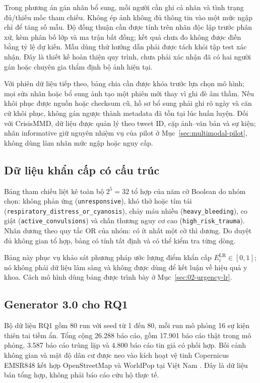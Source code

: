 Trong phương án gán nhãn bổ sung, mỗi người cần ghi cả nhãn và tình trạng đủ/thiếu mốc tham chiếu. Không ép ảnh không đủ thông tin vào một mức ngập chỉ để tăng số mẫu. Độ đồng thuận cần được tính trên nhãn độc lập trước phân xử, kèm phân bố lớp và ma trận bất đồng; kết quả chưa đo không được điền bằng tỷ lệ dự kiến. Mẫu dùng thử hướng dẫn phải được tách khỏi tập test xác nhận. Đây là thiết kế hoàn thiện quy trình, chưa phải xác nhận đã có hai người gán hoặc chuyên gia thẩm định bộ ảnh hiện tại.

Với phiên dữ liệu tiếp theo, bảng chia cần được khóa trước lựa chọn mô hình; mọi sửa nhãn hoặc bổ sung ảnh tạo một phiên mới thay vì ghi đè âm thầm. Nếu khôi phục được nguồn hoặc checksum cũ, hồ sơ bổ sung phải ghi rõ ngày và căn cứ khôi phục, không gán ngược thành metadata đã tồn tại lúc huấn luyện. Đối với CrisisMMD, dữ liệu được quản lý theo tweet ID, cặp ảnh--văn bản và sự kiện; nhãn informative giữ nguyên nhiệm vụ của pilot ở Mục~\ref{sec:multimodal-pilot}, không dùng làm nhãn mức ngập hoặc nguy cấp.

\subsection{Dữ liệu khẩn cấp có cấu trúc}
Bảng tham chiếu liệt kê toàn bộ $2^5=32$ tổ hợp của năm cờ Boolean do nhóm chọn: không phản ứng (\texttt{unresponsive}), khó thở hoặc tím tái (\texttt{respiratory\_\allowbreak{}distress\_\allowbreak{}or\_\allowbreak{}cyanosis}), chảy máu nhiều (\texttt{heavy\_bleeding}), co giật (\texttt{active\_convulsions}) và chấn thương nguy cơ cao (\texttt{high\_risk\_trauma}). Nhãn dương theo quy tắc OR của nhóm: có ít nhất một cờ thì dương. Do duyệt đủ không gian tổ hợp, bảng có tính tất định và có thể kiểm tra từng dòng.

Bảng này phục vụ khảo sát phương pháp ước lượng điểm khẩn cấp $E_i^{\mathrm{LR}}\in[0,1]$; nó không phải dữ liệu lâm sàng và không được dùng để kết luận về hiệu quả y khoa. Cách mô hình dùng bảng được trình bày ở Mục~\ref{sec:02-urgency-lr}.

\subsection{Generator 3.0 cho RQ1}
Bộ dữ liệu RQ1 gồm 80 run với seed từ 1 đến 80, mỗi run mô phỏng 16 sự kiện thiên tai tiềm ẩn. Tổng cộng 26.288 báo cáo, gồm 17.901 báo cáo thật trong mô phỏng, 3.587 báo cáo trùng lặp và 4.800 báo cáo tin giả có phối hợp. Bối cảnh không gian và mật độ dân cư được neo vào kích hoạt vệ tinh Copernicus EMSR848 kết hợp OpenStreetMap và WorldPop tại Việt Nam \citep{copernicusEMSR848,worldpop2025vietnam}. Đây là dữ liệu bán tổng hợp, không phải báo cáo cứu hộ thực tế.

